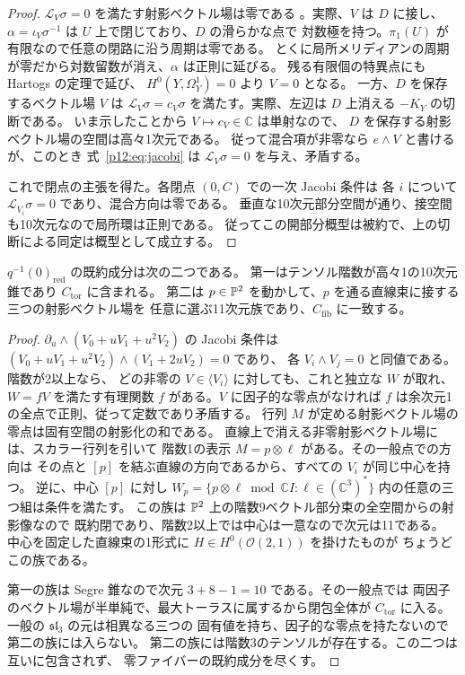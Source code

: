 \begin{proof}
$\mathcal L_V\sigma=0$ を満たす射影ベクトル場は零である
\cite[Prop.~15.1]{Polishchuk1997}。実際、$V$ は $D$ に接し、
$\alpha=\iota_V\sigma^{-1}$ は $U$ 上で閉じており、$D$ の滑らかな点で
対数極を持つ。$\pi_1(U)$ が有限なので任意の閉路に沿う周期は零である。
とくに局所メリディアンの周期が零だから対数留数が消え、$\alpha$ は正則に延びる。
残る有限個の特異点にも Hartogs の定理で延び、
$H^0(Y,\Omega_Y^1)=0$ より $V=0$ となる。
一方、$D$ を保存するベクトル場 $V$ は $\mathcal L_V\sigma=c_V\sigma$
を満たす。実際、左辺は $D$ 上消える $-K_Y$ の切断である。
いま示したことから $V\mapsto c_V\in\mathbb C$ は単射なので、
$D$ を保存する射影ベクトル場の空間は高々1次元である。
従って混合項が非零なら $e\wedge V$ と書けるが、このとき
式~\eqref{p12:eq:jacobi} は $\mathcal L_V\sigma=0$ を与え、矛盾する。

これで閉点の主張を得た。各閉点 $(0,C)$ での一次 Jacobi 条件は
各 $i$ について $\mathcal L_{\dot V_i}\sigma=0$ であり、混合方向は零である。
垂直な10次元部分空間が通り、接空間も10次元なので局所環は正則である。
従ってこの開部分概型は被約で、上の切断による同定は概型として成立する。
\end{proof}

\begin{proposition}\label{p12:prop:zero-cubic}
$q^{-1}(0)_{\mathrm{red}}$ の既約成分は次の二つである。
第一はテンソル階数が高々1の10次元錐であり $C_{\mathrm{tor}}$ に含まれる。
第二は $p\in\mathbb P^2$ を動かして、$p$ を通る直線束に接する三つの射影ベクトル場を
任意に選ぶ11次元族であり、$C_{\mathrm{fib}}$ に一致する。
\end{proposition}
\begin{proof}
$\partial_u\wedge (V_0+uV_1+u^2 V_2)$ の Jacobi 条件は
$(V_0+uV_1+u^2 V_2)\wedge(V_1+2uV_2)=0$ であり、
各 $V_i\wedge V_j=0$ と同値である。階数が2以上なら、
どの非零の $V\in\langle V_i\rangle$ に対しても、これと独立な $W$ が取れ、
$W=fV$ を満たす有理関数 $f$ がある。$V$ に因子的な零点がなければ
$f$ は余次元1の全点で正則、従って定数であり矛盾する。
行列 $M$ が定める射影ベクトル場の零点は固有空間の射影化の和である。
直線上で消える非零射影ベクトル場には、スカラー行列を引いて
階数1の表示 $M=p\otimes\ell$ がある。その一般点での方向は
その点と $[p]$ を結ぶ直線の方向であるから、すべての $V_i$ が同じ中心を持つ。
逆に、中心 $[p]$ に対し
$W_p=\{p\otimes\ell\bmod\mathbb C I:\ell\in(\mathbb C^3)^*\}$
内の任意の三つ組は条件を満たす。
この族は $\mathbb P^2$ 上の階数9ベクトル部分束の全空間からの射影像なので
既約閉であり、階数2以上では中心は一意なので次元は11である。
中心を固定した直線束の1形式に $H\in H^0(\mathcal O(2,1))$ を掛けたものが
ちょうどこの族である。

第一の族は Segre 錐なので次元 $3+8-1=10$ である。その一般点では
両因子のベクトル場が半単純で、最大トーラスに属するから閉包全体が
$C_{\mathrm{tor}}$ に入る。一般の $\mathfrak{sl}_3$ の元は相異なる三つの
固有値を持ち、因子的な零点を持たないので第二の族には入らない。
第二の族には階数3のテンソルが存在する。この二つは互いに包含されず、
零ファイバーの既約成分を尽くす。
\end{proof}



